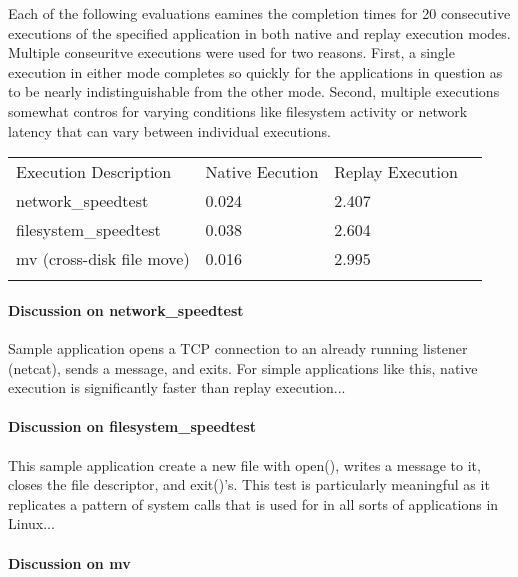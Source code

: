         Each of the following evaluations eamines the completion times for 20 consecutive executions of the specified
        application in both native and replay execution modes.  Multiple conseuritve executions were used for two
        reasons.  First, a single execution in either mode completes so quickly for the applications in question as to
        be nearly indistinguishable from the other mode.  Second, multiple executions somewhat contros for varying
        conditions like filesystem activity or network latency that can vary between individual executions.

            \begin{table}[H]
                \scriptsize{}
                \begin{tabular}{l  l  l  l}
                    \toprule{}
                        Execution Description & Native Eecution & Replay Execution\\
                        network\_speedtest & 0.024 & 2.407 \\
                        filesystem\_speedtest & 0.038 & 2.604 \\
                        mv (cross-disk file move) & 0.016 & 2.995 \\
                    \bottomrule{}
                \end{tabular}
            \end{table}

        \paragraph{Discussion on network\_speedtest}

        Sample application opens a TCP connection to an already running listener (netcat), sends a message, and
        exits. For simple applications like this, native execution is significantly faster than replay execution...

        \paragraph{Discussion on filesystem\_speedtest}

        This sample application create a new file with open(), writes a message to it, closes the file descriptor, and
        exit()'s. This test is particularly meaningful as it replicates a pattern of system calls that is used for in
        all sorts of applications in Linux...

        \paragraph{Discussion on mv}

